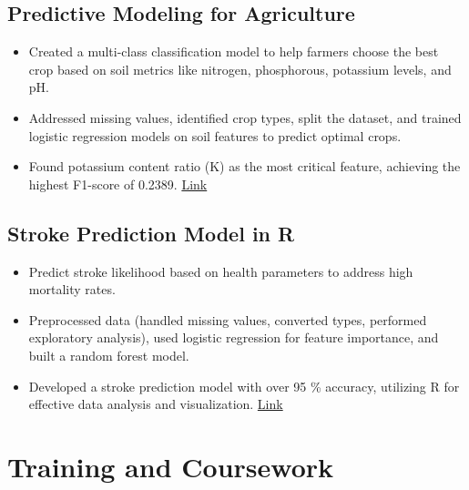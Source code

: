 \documentclass[a4paper,10pt]{article}
\begin{document}
\subsection{Predictive Modeling for Agriculture}
\begin{itemize}
    \item Created a multi-class classification model to help farmers choose the best crop based on soil metrics like nitrogen, phosphorous, potassium levels, and pH.
    \item Addressed missing values, identified crop types, split the dataset, and trained logistic regression models on soil features to predict optimal crops.
    \item Found potassium content ratio (K) as the most critical feature, achieving the highest F1-score of 0.2389. \href{https://github.com/anoushkaacc/Machine-Learning-fundamentals-with-Python/tree/main/Project%3A%20Predictive%20Modeling%20for%20Agriculture}{Link}
\end{itemize}
\subsection{Stroke Prediction Model in R} 
\begin{itemize}
    \item Predict stroke likelihood based on health parameters to address high mortality rates.
    \item Preprocessed data (handled missing values, converted types, performed exploratory analysis), used logistic regression for feature importance, and built a random forest model.
    \item Developed a stroke prediction model with over 95 \% accuracy, utilizing R for effective data analysis and visualization. \href{https://github.com/anoushkaacc/R-for-Data-Science}{Link} 
\end{itemize}

\section*{Training and Coursework}
\end{document}
